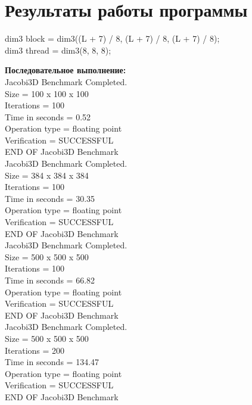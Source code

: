 \documentclass[a4paper,12pt,titlepage,draft]{article}
\begin{document}
\section{Результаты работы программы}
\begin{center}
    dim3 block = dim3((L + 7) / 8, (L + 7) / 8, (L + 7) / 8);\\
    dim3 thread = dim3(8, 8, 8);\\
\end{center}
\begin{minipage}{.5\textwidth}
\textbf{Последовательное выполнение:}\\

 Jacobi3D Benchmark Completed.\\
 Size            =  100 x  100 x  100\\
 Iterations      =                100\\
 Time in seconds =               0.52\\
 Operation type  =     floating point\\
 Verification    =         SUCCESSFUL\\
 END OF Jacobi3D Benchmark\\
 
Jacobi3D Benchmark Completed.\\
Size            =  384 x  384 x  384\\
Iterations      =                100\\
Time in seconds =              30.35\\
Operation type  =     floating point\\
Verification    =         SUCCESSFUL\\
END OF Jacobi3D Benchmark\\

Jacobi3D Benchmark Completed.\\
 Size            =  500 x  500 x  500\\
 Iterations      =                100\\
 Time in seconds =              66.82\\
 Operation type  =     floating point\\
 Verification    =         SUCCESSFUL\\
 END OF Jacobi3D Benchmark\\

Jacobi3D Benchmark Completed.\\
 Size            =  500 x  500 x  500\\
 Iterations      =                200\\
 Time in seconds =             134.47\\
 Operation type  =     floating point\\
 Verification    =         SUCCESSFUL\\
 END OF Jacobi3D Benchmark\\
 
\end{minipage}
\end{document}
